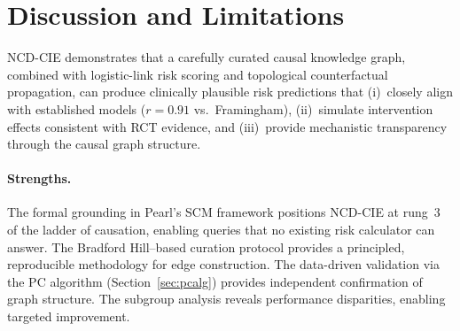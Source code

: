 \documentclass[runningheads]{llncs}
\begin{document}
\section{Discussion and Limitations}\label{sec:discussion}

NCD-CIE demonstrates that a carefully curated causal knowledge graph,
combined with logistic-link risk scoring and topological counterfactual
propagation, can produce clinically plausible risk predictions that
(i)~closely align with established models ($r = 0.91$ vs.\
Framingham), (ii)~simulate intervention effects consistent with RCT
evidence, and (iii)~provide mechanistic transparency through the
causal graph structure.

\paragraph{Strengths.}
The formal grounding in Pearl's SCM framework positions NCD-CIE at
rung~3 of the ladder of causation, enabling queries that no existing
risk calculator can answer.  The Bradford Hill--based curation
protocol provides a principled, reproducible methodology for edge
construction.  The data-driven validation via the PC algorithm
(Section~\ref{sec:pcalg}) provides independent confirmation of graph
structure.  The subgroup analysis reveals performance disparities,
enabling targeted improvement.
\end{document}
